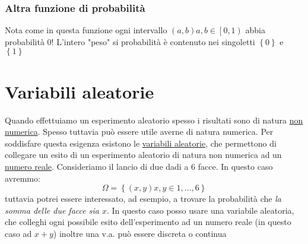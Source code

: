 \begin{center}
			\subsubsection*{Altra funzione di probabilità }
		\end{center}
	Nota come in questa funzione ogni intervallo $ \left(a,b\right) a,b \in \left[0,1\right)$ abbia probabilità 0! L'intero "peso" si probabilità è contenuto nei singoletti $ \left\{0\right\} $ e $ \left\{1\right\} $
\section{Variabili aleatorie}
Quando effettuiamo un esperimento aleatorio spesso i risultati sono di natura \underline{non numerica}. Spesso tuttavia può essere utile averne di natura numerica. Per soddisfare questa esigenza esistono le \underline{variabili aleatorie}, che permettono di collegare un esito di un esperimento aleatorio di natura non numerica ad un \underline{numero reale}.
Consideriamo il lancio di due dadi a 6 facce. In questo caso avremmo:
\[
	\Omega = \left\{\left(x, y\right) x,y \in 1,\ldots ,6\right\}
\]
tuttavia potrei essere interessato, ad esempio, a trovare la probabilità che \textit{la somma delle due facce sia $ x $}. In questo caso posso usare una variabile aleatoria, che colleghi ogni possibile esito dell'esperimento ad un numero reale (in questo caso ad $ x+y $)
inoltre una v.a. può essere discreta o continua
